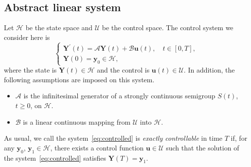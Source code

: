 \documentclass[10pt]{elsarticle}
\begin{document}
\subsection{Abstract linear system}
\label{subsec:obs}

Let $\mathcal{H}$ be the state space and $\mathcal{U}$ be the control space.
The control system we consider here is
\begin{equation} 
\left
    \{
        \begin{array}{ll}
            \mathbf{Y}^{\prime}(t)=\mathcal{A}\mathbf{Y}(t)+ \mathcal{B}\mathbf{u}(t), \quad t\in[0, T],\\
            \mathbf{Y}(0)=\mathbf{y}_0 \in \mathcal{H},  
        \end{array} \label{eq:controlled}
\right.
\end{equation}
where the state is $\mathbf{ Y}(t)\in \mathcal{H}$ and the control is $\mathbf{u}(t)\in\mathcal{U}$. In addition, the following assumptions are imposed on this system.
\begin{itemize}
\item $\mathcal{A}$ is the infinitesimal generator of a strongly continuous semigroup $S(t)$, $t\geqslant 0$, on $\mathcal{H}$.
\item $\mathcal{B}$ is a linear continuous mapping from $\mathcal{U}$ into $\mathcal{H}$.
\end{itemize}
As usual, we call the system~\eqref{eq:controlled} is \emph{exactly controllable} in time $T$ if, for any $\mathbf{y}_0$, $\mathbf{y}_1\in \mathcal{H}$, there exists a control function $\mathbf{u}\in \mathcal{U}$ such that the solution of the system~\eqref{eq:controlled} satisfies $\mathbf{Y} (T) = \mathbf{y}_1$. 
\end{document}
